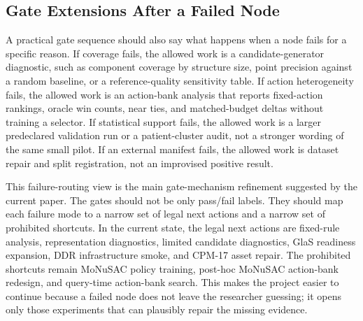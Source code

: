 \subsection{Gate Extensions After a Failed Node}
A practical gate sequence should also say what happens when a node fails for a specific reason. If coverage fails, the allowed work is a candidate-generator diagnostic, such as component coverage by structure size, point precision against a random baseline, or a reference-quality sensitivity table. If action heterogeneity fails, the allowed work is an action-bank analysis that reports fixed-action rankings, oracle win counts, near ties, and matched-budget deltas without training a selector. If statistical support fails, the allowed work is a larger predeclared validation run or a patient-cluster audit, not a stronger wording of the same small pilot. If an external manifest fails, the allowed work is dataset repair and split registration, not an improvised positive result.

This failure-routing view is the main gate-mechanism refinement suggested by the current paper. The gates should not be only pass/fail labels. They should map each failure mode to a narrow set of legal next actions and a narrow set of prohibited shortcuts. In the current state, the legal next actions are fixed-rule analysis, representation diagnostics, limited candidate diagnostics, GlaS readiness expansion, DDR infrastructure smoke, and CPM-17 asset repair. The prohibited shortcuts remain MoNuSAC policy training, post-hoc MoNuSAC action-bank redesign, and query-time action-bank search. This makes the project easier to continue because a failed node does not leave the researcher guessing; it opens only those experiments that can plausibly repair the missing evidence.

